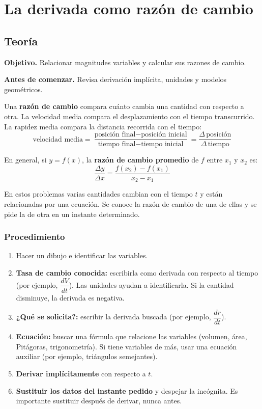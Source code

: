 \documentclass[12pt]{article}
\begin{document}
\section{La derivada como razón de cambio}

\subsection{Teoría}

\textbf{Objetivo.} Relacionar magnitudes variables y calcular sus razones de cambio.

\textbf{Antes de comenzar.} Revisa derivación implícita, unidades y modelos geométricos.


Una \textbf{razón de cambio} compara cuánto cambia una cantidad con respecto a otra. La velocidad media compara el desplazamiento con el tiempo transcurrido. La rapidez media compara la distancia recorrida con el tiempo:
\[
\text{velocidad media} = \frac{\text{posición final} - \text{posición inicial}}{\text{tiempo final} - \text{tiempo inicial}} = \frac{\Delta\, \text{posición}}{\Delta\, \text{tiempo}}
\]

En general, si $y = f(x)$, la \textbf{razón de cambio promedio} de $f$ entre $x_1$ y $x_2$ es:
\[
\frac{\Delta y}{\Delta x} = \frac{f(x_2) - f(x_1)}{x_2 - x_1}
\]




En estos problemas varias cantidades cambian con el tiempo $t$ y están relacionadas por una ecuación. Se conoce la razón de cambio de una de ellas y se pide la de otra en un instante determinado.



\subsubsection{Procedimiento}


\begin{enumerate}
    \item Hacer un dibujo e identificar las variables.
    \item \textbf{Tasa de cambio conocida:} escribirla como derivada con respecto al tiempo (por ejemplo, $\dfrac{dV}{dt}$). Las unidades ayudan a identificarla. Si la cantidad disminuye, la derivada es negativa.
    \item \textbf{¿Qué se solicita?:} escribir la derivada buscada (por ejemplo, $\dfrac{dr}{dt}$).
    \item \textbf{Ecuación:} buscar una fórmula que relacione las variables (volumen, área, Pitágoras, trigonometría). Si tiene variables de más, usar una ecuación auxiliar (por ejemplo, triángulos semejantes).
    \item \textbf{Derivar implícitamente} con respecto a $t$.
    \item \textbf{Sustituir los datos del instante pedido} y despejar la incógnita. Es importante sustituir después de derivar, nunca antes.
\end{enumerate}
\end{document}

